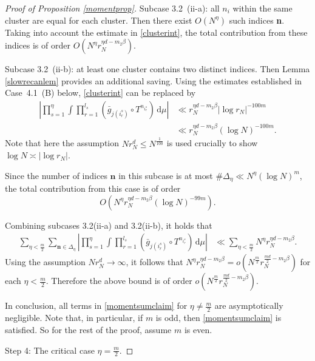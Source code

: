 \documentclass[11pt,twoside,a4paper,reqno]{amsart}
\renewcommand{\d}{\, \text{d}}
\begin{document}
\begin{proof}[Proof of Proposition \ref{momentprop}]
Subcase 3.2~(ii-a): all $n_i$ within the same cluster are equal for each cluster.
Then there exist $O(N^\eta)$ such indices \textbf{n}. Taking into account the estimate in \eqref{clusterint}, the total contribution from these indices is of order $O\left(N^{\eta} r_N^{\eta d - m_2 \beta}\right).$



Subcase 3.2~(ii-b): at least one cluster contains two distinct indices. Then Lemma \ref{slowrecanlem} provides an additional saving. Using the estimates established in Case~4.1~(B) below,
\eqref{clusterint} can be replaced by
\begin{align*}
\left| \prod_{s=1}^{\eta} \int \prod_{r=1}^{l_s} (\bar{g}_{j(i^s_r)} \circ T^{n_{i^s_r}} )\d\mu \right| &\ll
r_N^{\eta d - m_2 \beta} |\log r_N|^{-100m} \\
&\ll
r_N^{\eta d - m_2 \beta} (\log N)^{-100m}.
\end{align*}
Note that here the assumption $N r_N^d\leq N^{\frac{1}{100}}$ is used crucially to show $\log N \asymp |\log r_N|$.

Since the number of indices $\mathbf{n}$ in this subcase is at most $\#\Delta_{\eta}\ll N^{\eta} (\log N)^m$, the total contribution from this case is of order
\begin{equation*}
O\left(N^{\eta} r_N^{\eta d - m_2 \beta} (\log N)^{-99m}\right).
\end{equation*}


Combining subcases 3.2(ii-a) and 3.2(ii-b), it holds that
\begin{align*}
\sum_{\eta < \frac{m}{2}} \sum_{\textbf{n} \in \Delta_{\eta}} \left| \prod_{s=1}^{\eta} \int \prod_{r=1}^{l_s} (\bar{g}_{j(i^s_r)} \circ T^{n_{i^s_r}}) \d\mu\right| &\ll \sum_{\eta < \frac{m}{2}} N^{\eta} r_N^{\eta d - m_2 \beta}.
\end{align*}
Using the assumption $N r_N^d \rightarrow\infty$, it follows that $N^{\eta} r_N^{\eta d - m_2 \beta} =o\left( N^{\frac{m}{2}} r_N^{\frac{md}{2} - m_2 \beta}\right)$ for each $\eta<\frac{m}{2}$. Therefore the above bound is of order $o\left( N^{\frac{m}{2}} r_N^{\frac{md}{2} - m_2 \beta}\right)$.


In conclusion, all terms in \eqref{momentsumclaim} for $\eta \neq \frac{m}{2}$ are asymptotically negligible. Note that, in particular, if $m$ is odd, then \eqref{momentsumclaim} is satisfied. So for the rest of the proof, assume $m$ is even.

Step 4: The critical case $\eta=\frac{m}{2}$.


\end{proof}
\end{document}

